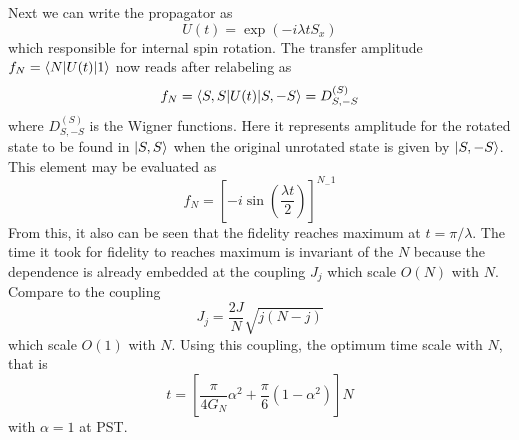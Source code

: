 \documentclass[../../../main.tex]{subfiles}
\begin{document}
Next we can write the propagator as
\begin{equation*}
    U(t) = \exp (-i \lambda t S_x)
\end{equation*}
which responsible for internal spin rotation.
The transfer amplitude $f_N = \braket{N |U(t)|1 }$ now reads after relabeling as
\begin{equation*}
    f_N = \braket{S,S |U(t) |S,-S} =D^{(S)}_{S,-S}
\end{equation*}
where $D^{(S)}_{S,-S} $ is the Wigner functions.
Here it represents amplitude for the rotated state to be found in $\ket{S,S}$ when the original unrotated state is given by $\ket{S,-S}$.
This element may be evaluated as
\begin{equation*}
    f_N= \left[-i\sin\left(\frac{\lambda t}{2}\right)\right]^{N_-1}
\end{equation*}
From this, it also can be seen that the fidelity reaches maximum at $t  = \pi/\lambda$.
The time it took for fidelity to reaches maximum is invariant of the $N$ because the dependence is already embedded at the coupling $J_j$ which scale $O(N)$ with $N$.
Compare to the coupling
\begin{equation*}
    J_j = \frac{2J }{N} \sqrt{j(N-j)}
\end{equation*}
which scale $O(1)$ with $N$.
Using this coupling, the optimum time scale with $N$, that is
\begin{equation*}
    t = \left[\frac{\pi}{4G_N}\alpha^2 + \frac{\pi}{6}(1-\alpha^2)\right]N
\end{equation*}
with $\alpha=1$ at PST.
\end{document}

